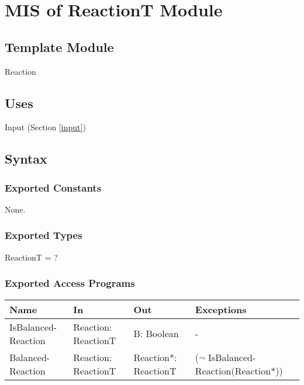 \documentclass[12pt, titlepage]{article}
\begin{document}
\newpage


\section{MIS of ReactionT Module} \label{Reaction} 

\subsection{Template Module}

Reaction

\subsection{Uses}

 Input (Section \ref{input})

\subsection{Syntax}

\subsubsection{Exported Constants}

None.

\subsubsection{Exported Types}

ReactionT = ?

\subsubsection{Exported Access Programs}

\begin{center}
\begin{tabular}{p{2cm} p{4cm} p{4cm} p{2cm}}
\hline
\textbf{Name} & \textbf{In} & \textbf{Out} & \textbf{Exceptions} \\
\hline
{IsBalanced-Reaction} & Reaction: \newline ReactionT &  B: Boolean  & - \\
\hline
{Balanced-Reaction} & Reaction: \newline ReactionT &  Reaction*: \newline ReactionT  &  ($\neg$ IsBalanced-Reaction(Reaction*))\\
\hline
\end{tabular}
\end{center}
\end{document}
